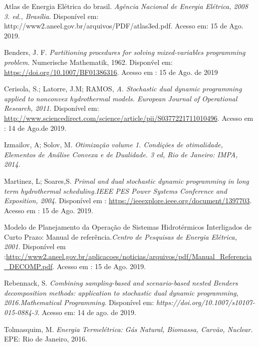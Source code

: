 \documentclass[12pt,fleqn]{article}
\begin{document}
\begin{description}[noitemsep]
\fontsize{11}{0}\selectfont
\item
Atlas de Energia Elétrica do brasil. {\em Ag\^encia Nacional de Energia El\'etrica, 2008
3. ed., Brasília}. Dispon\'ivel em: http://www2.aneel.gov.br/arquivos/PDF/atlas3ed.pdf. Acesso em: 15 de Ago. 2019.
\vspace{-0.1mm}
\item
Benders, J. F. {\em Partitioning procedures for solving mixed-variables programming problem}. Numerische Mathematik, 1962. Dispon\'vel em: \url {https://doi.org/10.1007/BF01386316}. Acesso em : 15 de Ago. de 2019
\item
Cerisola, S.; Latorre, J.M; RAMOS, {\em A. Stochastic dual dynamic programming applied to nonconvex hydrothermal models. European Journal of Operational Research, 2011}. Dispon\'ivel em: \url {http://www.sciencedirect.com/science/article/pii/S0377221711010496}. Acesso em : 14 de Ago.de 2019.
\item
Izmailov, A; Solov, M. {\em Otimiza\c c\~ao volume 1. Condi\c c\~oes de otimalidade, Elementos de An\'alise Convexa e de Dualidade. 3 ed, Rio de Janeiro: IMPA, 2014}. 
\item
Martinez, L; Soares,S. {\em Primal and dual stochastic dynamic programming in long term hydrothermal scheduling.IEEE PES Power Systems Conference and Exposition, 2004}.
Dispon\'ivel em : \url {https://ieeexplore.ieee.org/document/1397703}. 
Acesso em : 15 de Ago. 2019.
\item
Modelo de Planejamento da Operação de Sistemas Hidrotérmicos Interligados de Curto Prazo: Manual de refer\^encia.{\em Centro de Pesquisas de Energia Elétrica, 2001}. Dispon\'ivel em :\url {http://www2.aneel.gov.br/aplicacoes/noticias/arquivos/pdf/Manual_Referencia_DECOMP.pdf}. Acesso em : 15 de Ago. 2019.
\item
Rebennack, S. {\em Combining  sampling-based and scenario-based nested Benders decomposition methods: application to stochastic dual dynamic programming, 2016.Mathematical Programming}. 
Dispon\'ivel em: {\em https://doi.org/10.1007/s10107-015-0884-3}. Acesso em: 14 de ago. de 2019.
 \item
 Tolmasquim, M. {\em Energia Termel\'etrica: G\'as Natural, Biomassa, Carv\~ao, Nuclear.} EPE: Rio de Janeiro, 2016.
\end{description}
\vspace*{-0.1cm}





\end{document}
